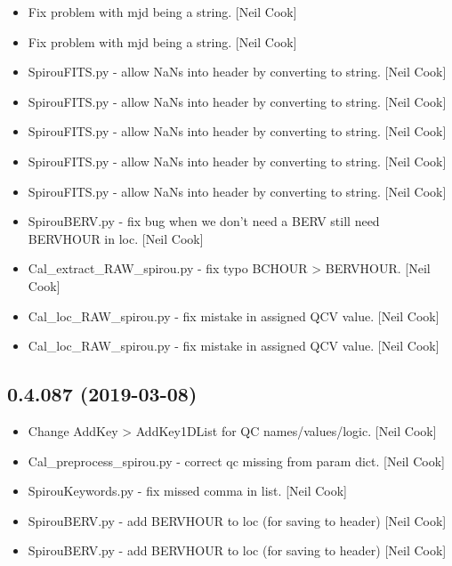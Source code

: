 \documentclass[a4paper,10pt,english]{report}
\begin{document}
\begin{itemize}
\item {} 
Fix problem with mjd being a string. {[}Neil Cook{]}

\item {} 
Fix problem with mjd being a string. {[}Neil Cook{]}

\item {} 
SpirouFITS.py - allow NaNs into header by converting to string. {[}Neil
Cook{]}

\item {} 
SpirouFITS.py - allow NaNs into header by converting to string. {[}Neil
Cook{]}

\item {} 
SpirouFITS.py - allow NaNs into header by converting to string. {[}Neil
Cook{]}

\item {} 
SpirouFITS.py - allow NaNs into header by converting to string. {[}Neil
Cook{]}

\item {} 
SpirouFITS.py - allow NaNs into header by converting to string. {[}Neil
Cook{]}

\item {} 
SpirouBERV.py - fix bug when we don’t need a BERV still need BERVHOUR
in loc. {[}Neil Cook{]}

\item {} 
Cal\_extract\_RAW\_spirou.py - fix typo BCHOUR \textendash{}\textgreater{} BERVHOUR. {[}Neil Cook{]}

\item {} 
Cal\_loc\_RAW\_spirou.py - fix mistake in assigned QCV value. {[}Neil Cook{]}

\item {} 
Cal\_loc\_RAW\_spirou.py - fix mistake in assigned QCV value. {[}Neil Cook{]}

\end{itemize}


\subsection{0.4.087 (2019-03-08)}
\label{\detokenize{misc/changelog:id172}}\begin{itemize}
\item {} 
Change AddKey \textendash{}\textgreater{} AddKey1DList for QC names/values/logic. {[}Neil Cook{]}

\item {} 
Cal\_preprocess\_spirou.py - correct qc missing from param dict. {[}Neil
Cook{]}

\item {} 
SpirouKeywords.py - fix missed comma in list. {[}Neil Cook{]}

\item {} 
SpirouBERV.py - add BERVHOUR to loc (for saving to header) {[}Neil Cook{]}

\item {} 
SpirouBERV.py - add BERVHOUR to loc (for saving to header) {[}Neil Cook{]}

\end{itemize}
\end{document}
